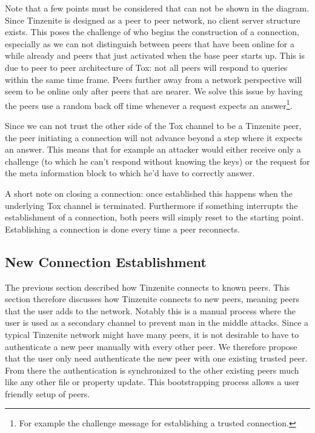 Note that a few points must be considered that can not be shown in the diagram.
Since Tinzenite is designed as a peer to peer network, no client server structure exists.
This poses the challenge of who begins the construction of a connection, especially as we can not distinguish between peers that have been online for a while already and peers that just activated when the base peer starts up.
This is due to peer to peer architecture of Tox: not all peers will respond to queries within the same time frame.
Peers further away from a network perspective will seem to be online only after peers that are nearer.
We solve this issue by having the peers use a random back off time whenever a request expects an answer\footnote{For example the challenge message for establishing a trusted connection.}.

Since we can not trust the other side of the Tox channel to be a Tinzenite peer, the peer initiating a connection will not advance beyond a step where it expects an answer.
This means that for example an attacker would either receive only a challenge (to which he can't respond without knowing the keys) or the request for the meta information block to which he'd have to correctly answer.

A short note on closing a connection: once established this happens when the underlying Tox channel is terminated.
Furthermore if something interrupts the establishment of a connection, both peers will simply reset to the starting point.
Establishing a connection is done every time a peer reconnects.

\subsection{New Connection Establishment}

The previous section described how Tinzenite connects to known peers.
This section therefore discusses how Tinzenite connects to new peers, meaning peers that the user adds to the network.
Notably this is a manual process where the user is used as a secondary channel to prevent man in the middle attacks.
Since a typical Tinzenite network might have many peers, it is not desirable to have to authenticate a new peer manually with every other peer.
We therefore propose that the user only need authenticate the new peer with one existing trusted peer.
From there the authentication is synchronized to the other existing peers much like any other file or property update.
This bootstrapping process allows a user friendly setup of peers.

